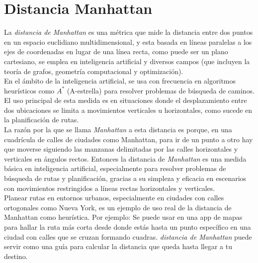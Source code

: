 \section{Distancia Manhattan}

La \textit{distancia de Manhattan} es una métrica que mide la distancia entre dos puntos en un espacio 
euclidiano multidimensional, y esta basada en líneas paralelas a los ejes de coordenadas en lugar de 
una línea recta, como puede ser un plano cartesiano, se emplea en inteligencia artificial y diversos 
campos (que incluyen la teoría de grafos, geometría computacional y optimización).\\ 


En el ámbito de la inteligencia artificial, se usa con frecuencia en algoritmos heurísticos como $A^{*}$ 
(A-estrella) para resolver problemas de búsqueda de caminos. El uso principal de esta medida es en 
situaciones donde el desplazamiento entre dos ubicaciones se limita a movimientos verticales u 
horizontales, como sucede en la planificación de rutas.\\ 


La razón por la que se llama \textit{Manhattan} a esta distancia es porque, en una cuadrícula de calles 
de ciudades como Manhattan, para ir de un punto a otro hay que moverse siguiendo las manzanas 
delimitadas por las calles horizontales y verticales en ángulos rectos. Entonces la distancia de 
\textit{Manhattan} es una medida básica en inteligencia artificial, especialmente para resolver 
problemas de búsqueda de rutas y planificación, gracias a su simpleza y eficacia en escenarios con 
movimientos restringidos a líneas rectas horizontales y verticales.\\ 


Planear rutas en entornos urbanos, especialmente en ciudades con calles ortogonales como Nueva York,
es un ejemplo de uso real de la distancia de Manhattan como heurística. Por ejemplo: Se puede usar 
en una app de mapas para hallar la ruta más corta desde donde estás hasta un punto específico en 
una ciudad con calles que se cruzan formando cuadras. \textit{distancia de Manhattan} puede servir 
como una guía para calcular la distancia que queda hasta llegar a tu destino.\\ 


